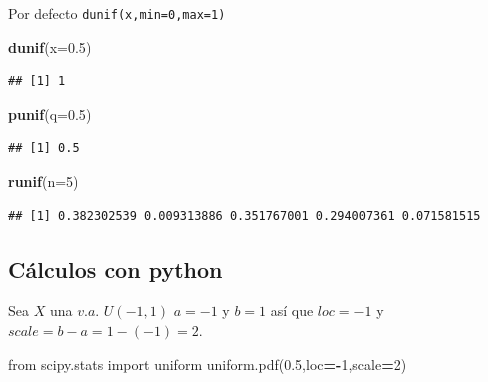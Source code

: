 \documentclass[]{book}
\newenvironment{Shaded}{\begin{snugshade}}{\end{snugshade}}
\newcommand{\DataTypeTok}[1]{\textcolor[rgb]{0.13,0.29,0.53}{#1}}
\newcommand{\DecValTok}[1]{\textcolor[rgb]{0.00,0.00,0.81}{#1}}
\newcommand{\FloatTok}[1]{\textcolor[rgb]{0.00,0.00,0.81}{#1}}
\newcommand{\ImportTok}[1]{#1}
\newcommand{\KeywordTok}[1]{\textcolor[rgb]{0.13,0.29,0.53}{\textbf{#1}}}
\newcommand{\NormalTok}[1]{#1}
\newcommand{\OperatorTok}[1]{\textcolor[rgb]{0.81,0.36,0.00}{\textbf{#1}}}
\begin{document}
Por defecto \texttt{dunif(x,min=0,max=1)}

\begin{Shaded}
\begin{Highlighting}[]
\KeywordTok{dunif}\NormalTok{(}\DataTypeTok{x=}\FloatTok{0.5}\NormalTok{)}
\end{Highlighting}
\end{Shaded}

\begin{verbatim}
## [1] 1
\end{verbatim}

\begin{Shaded}
\begin{Highlighting}[]
\KeywordTok{punif}\NormalTok{(}\DataTypeTok{q=}\FloatTok{0.5}\NormalTok{)}
\end{Highlighting}
\end{Shaded}

\begin{verbatim}
## [1] 0.5
\end{verbatim}

\begin{Shaded}
\begin{Highlighting}[]
\KeywordTok{runif}\NormalTok{(}\DataTypeTok{n=}\DecValTok{5}\NormalTok{)}
\end{Highlighting}
\end{Shaded}

\begin{verbatim}
## [1] 0.382302539 0.009313886 0.351767001 0.294007361 0.071581515
\end{verbatim}

\hypertarget{cuxe1lculos-con-python-14}{%
\subsection{Cálculos con python}\label{cuxe1lculos-con-python-14}}

Sea \(X\) una \(v.a.\) \(U(-1,1)\) \(a=-1\) y \(b=1\) así que \(loc=-1\) y \(scale=b-a=1-(-1)=2.\)

\begin{Shaded}
\begin{Highlighting}[]
\ImportTok{from}\NormalTok{ scipy.stats }\ImportTok{import}\NormalTok{ uniform}
\NormalTok{uniform.pdf(}\FloatTok{0.5}\NormalTok{,loc}\OperatorTok{=-}\DecValTok{1}\NormalTok{,scale}\OperatorTok{=}\DecValTok{2}\NormalTok{)}
\end{Highlighting}
\end{Shaded}
\end{document}
